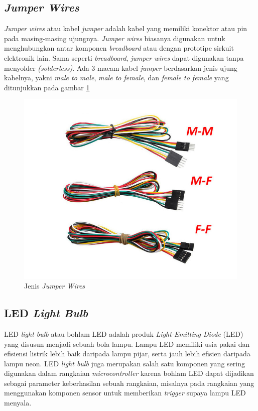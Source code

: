 \subsection{\textit{Jumper Wires}}
\tab \textit{Jumper wires} atau kabel \textit{jumper} adalah kabel yang memiliki konektor atau pin pada masing-masing ujungnya. \textit{Jumper wires} biasanya digunakan untuk menghubungkan antar komponen \textit{breadboard} atau dengan prototipe sirkuit elektronik lain. Sama seperti \textit{breadboard}, \textit{jumper wires} dapat digunakan tanpa menyolder \textit{(solderless)}. Ada 3 macam kabel \textit{jumper} berdasarkan jenis ujung kabelnya, yakni \textit{male to male}, \textit{male to female}, dan \textit{female to female} yang ditunjukkan pada gambar \ref{figure:jumperwires}

\begin{figure}[H]
	\centerline {
		\includegraphics[width=\linewidth]{bab3/img/jumperwires.png}
	}
	\caption{Jenis \textit{Jumper Wires}}
	\label{figure:jumperwires}
\end{figure}
 
\subsection{LED \textit{Light Bulb}}
\tab LED \textit{light bulb} atau bohlam LED adalah produk \textit{Light-Emitting Diode} (LED) yang disusun menjadi sebuah bola lampu. Lampu LED memiliki usia pakai dan efisiensi listrik lebih baik daripada lampu pijar, serta jauh lebih efisien daripada lampu neon. LED \textit{light bulb} juga merupakan salah satu komponen yang sering digunakan dalam rangkaian \textit{microcontroller} karena bohlam LED dapat dijadikan sebagai parameter keberhasilan sebuah rangkaian, misalnya pada rangkaian yang menggunakan komponen sensor untuk memberikan \textit{trigger} supaya lampu LED menyala.

